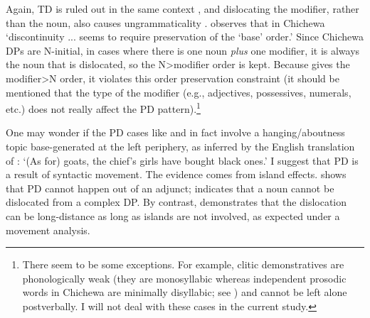 \documentclass[output=paper,colorlinks,citecolor=brown
]{langscibook}
\begin{document}
\ea\label{ex:chen:basepattern2}
  \begin{xlist}
  \label{ex:chen:TDbasic}

  \label{ex:chen:PDbasicbad}

  \label{ex:chen:PDbasic}
  \end{xlist}
\z

 Again, TD is ruled out in the same context , and dislocating the modifier, rather than the noun, also causes ungrammaticality . \citet{mchombo2006linear} observes that in Chichewa `discontinuity ... seems to require preservation of the `base’ order.' Since Chichewa DPs are N-initial, in cases where there is one noun \textit{plus} one modifier, it is always the noun that is dislocated, so the N>modifier order is kept. Because  gives the modifier>N order, it violates this order preservation constraint (it should be mentioned that the type of the modifier (e.g., adjectives, possessives, numerals, etc.) does not really affect the PD pattern).\footnote{There seem to be some exceptions. For example, clitic demonstratives are phonologically weak (they are monosyllabic whereas independent prosodic words in Chichewa are minimally disyllabic; see \citealp{downing2017phonology}) and cannot be left alone postverbally. I will not deal with these cases in the current study.}

One may wonder if the PD cases like  and  in fact involve a hanging/aboutness topic base-generated at the left periphery, as inferred by the English translation of : `(As for) goats, the chief's girls have bought black ones.' I suggest that PD is a result of syntactic movement. The evidence comes from island effects.  shows that PD cannot happen out of an adjunct;  indicates that a noun cannot be dislocated from a complex DP. By contrast,  demonstrates that the dislocation can be long-distance as long as islands are not involved, as expected under a movement analysis.
\end{document}
